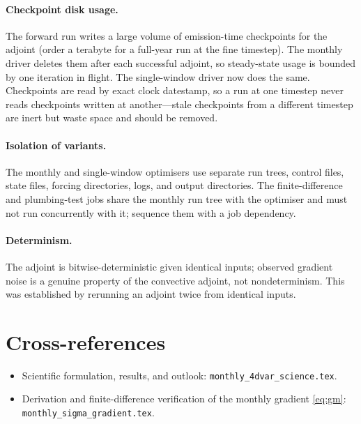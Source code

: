 \documentclass[11pt]{article}
\newcommand{\code}[1]{\texttt{#1}}
\begin{document}
\paragraph{Checkpoint disk usage.} The forward run writes a large volume of
emission-time checkpoints for the adjoint (order a terabyte for a full-year run at
the fine timestep). The monthly driver deletes them after each successful adjoint,
so steady-state usage is bounded by one iteration in flight. The single-window
driver now does the same. Checkpoints are read by exact clock datestamp, so a run
at one timestep never reads checkpoints written at another---stale checkpoints from
a different timestep are inert but waste space and should be removed.

\paragraph{Isolation of variants.} The monthly and single-window optimisers use
separate run trees, control files, state files, forcing directories, logs, and
output directories. The finite-difference and plumbing-test jobs share the monthly
run tree with the optimiser and must not run concurrently with it; sequence them
with a job dependency.

\paragraph{Determinism.} The adjoint is bitwise-deterministic given identical
inputs; observed gradient noise is a genuine property of the convective adjoint,
not nondeterminism. This was established by rerunning an adjoint twice from
identical inputs.

\section{Cross-references}

\begin{itemize}[nosep]
  \item Scientific formulation, results, and outlook:
        \code{monthly\_4dvar\_science.tex}.
  \item Derivation and finite-difference verification of the monthly gradient
        \eqref{eq:gm}: \code{monthly\_sigma\_gradient.tex}.
\end{itemize}
\end{document}
